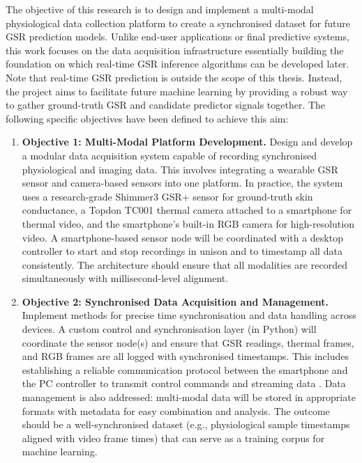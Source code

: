 The objective of this research is to design and implement a multi-modal physiological data collection platform to create a synchronised dataset for future GSR prediction models. Unlike end-user applications or final predictive systems, this work focuses on the data acquisition infrastructure \textemdash essentially building the foundation on which real-time GSR inference algorithms can be developed later. Note that real-time GSR prediction is outside the scope of this thesis. Instead, the project aims to facilitate future machine learning by providing a robust way to gather ground-truth GSR and candidate predictor signals together. The following specific objectives have been defined to achieve this aim:

\begin{enumerate}
    \item \textbf{Objective 1: Multi-Modal Platform Development.} Design and develop a modular data acquisition system capable of recording synchronised physiological and imaging data. This involves integrating a wearable GSR sensor and camera-based sensors into one platform. In practice, the system uses a research-grade Shimmer3 GSR+ sensor \citep{ref8} for ground-truth skin conductance, a Topdon TC001 thermal camera \citep{ref20} attached to a smartphone for thermal video, and the smartphone's built-in RGB camera for high-resolution video. A smartphone-based sensor node will be coordinated with a desktop controller to start and stop recordings in unison and to timestamp all data consistently. The architecture should ensure that all modalities are recorded simultaneously with millisecond-level alignment.
    \item \textbf{Objective 2: Synchronised Data Acquisition and Management.} Implement methods for precise time synchronisation and data handling across devices. A custom control and synchronisation layer (in Python) will coordinate the sensor node(s) and ensure that GSR readings, thermal frames, and RGB frames are all logged with synchronised timestamps. This includes establishing a reliable communication protocol between the smartphone and the PC controller to transmit control commands and streaming data \citep{ref9}. Data management is also addressed: multi-modal data will be stored in appropriate formats with metadata for easy combination and analysis. The outcome should be a well-synchronised dataset (e.g., physiological sample timestamps aligned with video frame times) that can serve as a training corpus for machine learning.

\end{enumerate}

